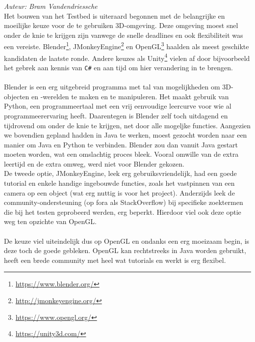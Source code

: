 {\em Auteur: Bram Vandendriessche}\\

\noindent
Het bouwen van het Testbed is uiteraard begonnen met de belangrijke en moeilijke keuze voor de te gebruiken 3D-omgeving. Deze omgeving moest snel onder de knie te krijgen zijn vanwege de snelle deadlines en ook flexibiliteit was een vereiste. Blender\footnote{\url{https://www.blender.org/}}, JMonkeyEngine\footnote{\url{http://jmonkeyengine.org/}} en OpenGL\footnote{\url{https://www.opengl.org/}} haalden als meest geschikte kandidaten de laatste ronde. Andere keuzes als Unity\footnote{\url{https://unity3d.com/}} vielen af door bijvoorbeeld het gebrek aan kennis van \texttt{C\#} en aan tijd om hier verandering in te brengen.\\
~\\
Blender is een erg uitgebreid programma met tal van mogelijkheden om 3D-objecten en -werelden te maken en te manipuleren. Het maakt gebruik van Python, een programmeertaal met een vrij eenvoudige leercurve voor wie al programmeerervaring heeft. Daarentegen is Blender zelf toch uitdagend en tijdrovend om onder de knie te krijgen, net door alle mogeljke functies. Aangezien we bovendien gepland hadden in Java te werken, moest gezocht worden naar een manier om Java en Python te verbinden. Blender zou dan vanuit Java gestart moeten worden, wat een omslachtig proces bleek. Vooral omwille van de extra leertijd en de extra omweg, werd niet voor Blender gekozen. \\
De tweede optie, JMonkeyEngine, leek erg gebruiksvriendelijk, had een goede tutorial en enkele handige ingebouwde functies, zoals het vastpinnen van een camera op een object (wat erg nuttig is voor het project). Anderzijds leek de community-ondersteuning (op fora als StackOverflow) bij specifieke zoektermen die bij het testen geprobeerd werden, erg beperkt. Hierdoor viel ook deze optie weg ten opzichte van OpenGL.\\
\\
De keuze viel uiteindelijk dus op OpenGL en ondanks een erg moeizaam begin, is deze toch de goede gebleken. OpenGL kan rechtstreeks in Java worden gebruikt, heeft een brede community met heel wat tutorials en werkt is erg flexibel.







